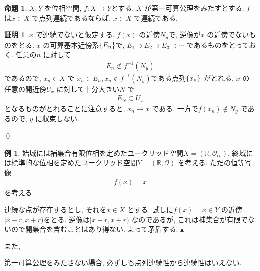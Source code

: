 \documentclass[10pt, fleqn, label-section=none]{bxjsarticle}
\theoremstyle{definition}
\newtheorem{ex}[dfn]{例}
\newtheorem{prop}[dfn]{命題}
\newtheorem*{pf*}{証明}
\newcommand{\any}{{}^{\forall}}
\newcommand{\cbra}[1]{\mleft\{#1\mright\}}
\newcommand{\naraba}{\Rightarrow}
\renewcommand{\;}{\, ; \,}
\newenvironment{claim}[1]{\par\noindent\underline{claim:}\space#1}{}
\newenvironment{claimproof}[1]{\par\noindent{($\because$)}\space#1}{\hfill $\blacktriangle $}
\begin{document}
\begin{prop}
$X, Y$ を位相空間, $f: X \rightarrow Y$とする. $X$ が第一可算公理をみたすとする. $f$ は$x \in X$ で点列連続であるならば, $x \in X $ で連続である. 
\end{prop}
\begin{pf*}
$x$ で連続でないと仮定する. $f(x)$ の近傍$N_{y}$で, 逆像が$x$ の近傍でないものをとる. $x$ の可算基本近傍系$\cbra{E_n}$で, $E_1 \supset E_2 \supset E_3 \supset \cdots  $ であるものをとっておく. 任意の$n$ に対して
\begin{align*} E_n \not\subset f^{-1} (N_y ) \end{align*}
であるので, $x_n  \in X$ で $x_n \in E_n , x_n \not \in  f^{-1} (N_y ) $である点列$\cbra{x_n}$ がとれる. $x$ の任意の開近傍$U_x$ に対して十分大きい$N$ で
\begin{align*} E_N \subset U_x \end{align*}
となるものがとれることに注意すると, $x_n \rightarrow x$ である. 一方で$f(x_n) \not \in N_{y}$ であるので, $y$ に収束しない. 

\qed
\end{pf*}


\begin{ex}
始域には補集合有限位相を定めたユークリッド空間$X = (\mathbb R, \mathcal O _{cc})$, 終域には標準的な位相を定めたユークリッド空間$Y = (\mathbb R, \mathcal O)$ を考える. ただの恒等写像
\begin{align*} f(x) = x\end{align*}
を考える. 
\begin{claimproof}
連続な点が存在するとし, それを$x \in X$ とする. 試しに$f(x) = x \in Y$ の近傍$[x - r, x + r)$をとる. 逆像は$[x-r, x+r)$ なのであるが, これは補集合が有限でないので開集合を含むことはあり得ない. よって矛盾する. 
\end{claimproof}

また, 

第一可算公理をみたさない場合, 必ずしも点列連続性から連続性はいえない. 
\end{ex}
\end{document}
